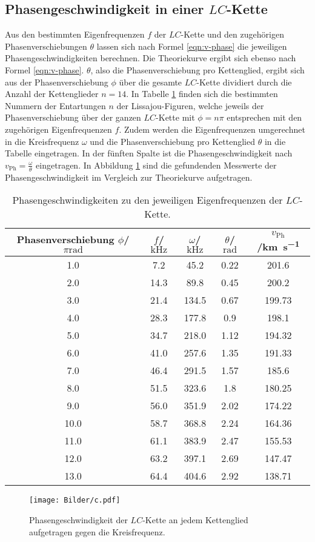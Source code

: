 \FloatBarrier
\subsection{Phasengeschwindigkeit in einer $LC$-Kette}

Aus den bestimmten Eigenfrequenzen $f$ der $LC$-Kette und den zugehörigen Phasenverschiebungen $\theta$ lassen sich nach Formel \eqref{eqn:v-phase} die jeweiligen Phasengeschwindigkeiten berechnen.
Die Theoriekurve ergibt sich ebenso nach Formel \eqref{eqn:v-phase}.
$\theta$, also die Phasenverschiebung pro Kettenglied, ergibt sich aus der Phasenverschiebung $\phi$ über die gesamte $LC$-Kette dividiert durch die Anzahl der Kettenglieder $n=14$.
In Tabelle \ref{tab:c} finden sich die bestimmten Nummern der Entartungen $n$ der Lissajou-Figuren, welche jeweils der Phasenverschiebung über der ganzen $LC$-Kette mit $\phi=n\pi$ entsprechen mit den zugehörigen Eigenfrequenzen $f$.
Zudem werden die Eigenfrequenzen umgerechnet in die Kreisfrequenz $\omega$ und die Phasenverschiebung pro Kettenglied $\theta$ in die Tabelle eingetragen.
In der fünften Spalte ist die Phasengeschwindigkeit nach $v_{\mathrm{Ph}}=\frac{\omega}{\theta}$ eingetragen.
In Abbildung \ref{fig:plotc} sind die gefundenden Messwerte der Phasengeschwindigkeit im Vergleich zur Theoriekurve aufgetragen.
\begin{table}
  \caption{Phasengeschwindigkeiten zu den jeweiligen Eigenfrequenzen der $LC$-Kette.}
\label{tab:c}
\centering
\begin{tabular}{ccccc}
\toprule
Phasenverschiebung $\phi$/$\pi\si{\radian}$ & $f$/$\si{\kilo\Hz}$ & $\omega$/$\si{\kilo\Hz}$ & $\theta$/$\si{\radian}$ & $v_{\mathrm{Ph}}$/\si{\kilo\metre\per\second} \\
\midrule
1.0 & 7.2 & 45.2 & 0.22 & 201.6 \\
2.0 & 14.3 & 89.8 & 0.45 & 200.2 \\
3.0 & 21.4 & 134.5 & 0.67 & 199.73 \\
4.0 & 28.3 & 177.8 & 0.9 & 198.1 \\
5.0 & 34.7 & 218.0 & 1.12 & 194.32 \\
6.0 & 41.0 & 257.6 & 1.35 & 191.33 \\
7.0 & 46.4 & 291.5 & 1.57 & 185.6 \\
8.0 & 51.5 & 323.6 & 1.8 & 180.25 \\
9.0 & 56.0 & 351.9 & 2.02 & 174.22 \\
10.0 & 58.7 & 368.8 & 2.24 & 164.36 \\
11.0 & 61.1 & 383.9 & 2.47 & 155.53 \\
12.0 & 63.2 & 397.1 & 2.69 & 147.47 \\
13.0 & 64.4 & 404.6 & 2.92 & 138.71 \\
\bottomrule
\end{tabular}
\end{table}
\begin{figure}
  \centering
 \texttt{[image: Bilder/c.pdf]}
  \caption{Phasengeschwindigkeit der $LC$-Kette an jedem Kettenglied aufgetragen gegen die Kreisfrequenz.}
  \label{fig:plotc}
\end{figure}
\FloatBarrier
